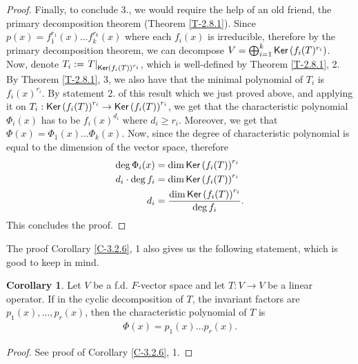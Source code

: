 \documentclass[letterpaper,11pt,twoside]{article}
\theoremstyle{definition}
\theoremstyle{definition}
\theoremstyle{definition}
\theoremstyle{definition}
\theoremstyle{definition}
\theoremstyle{definition}
\theoremstyle{remark}
\theoremstyle{definition}
\newtheorem{corollary}[proposition]{Corollary}
\newcommand{\Ker}[1]{{\fontfamily{lmss}\selectfont 
		\text{Ker}\left (#1\right )
}}
\newcommand{\rest}[2]{\left. { #1 }\right \vert_{#2}}
\begin{document}
\begin{proof}
    Finally, to conclude 3., we would require the help of an old friend, the primary decomposition theorem (Theorem \ref{T-2.8.1}). Since $ p(x) = f_{1}^{r_{1}}(x) \dots f_k^{r_k}(x) $ where each $ f_i(x) $ is irreducible, therefore by the primary decomposition theorem, we can decompose $ V = \bigoplus_{i=1}^{k}\Ker{f_{i}(T)^{r_i}}$. Now, denote $ T_i := \rest{T}{\Ker{f_{i}(T)}^{r_{i}}} $, which is well-defined by Theorem \ref{T-2.8.1}, 2. By Theorem \ref{T-2.8.1}, 3, we also have that the minimal polynomial of $ T_i $ is $ f_{i}(x)^{r_i} $. By statement 2. of this result which we just proved above, and applying it on $ T_i : \Ker{f_{i}(T)}^{r_{i}} \to \Ker{f_{i}(T)}^{r_{i}} $, we get that the characteristic polynomial $ \Phi_{i}(x) $ has to be $ f_{i}(x)^{d_i} $ where $ d_i \ge r_i $. Moreover, we get that $ \Phi(x) = \Phi_1(x)\dots \Phi_k(x) $. Now, since the degree of characteristic polynomial is equal to the dimension of the vector space, therefore 
    \begin{align*}
    	\deg \Phi_{i}(x) &= \dim \Ker{f_{i}(T)}^{r_{i}}\\
    	d_i\cdot \deg f_i &= \dim \Ker{f_{i}(T)}^{r_{i}}\\
    	d_i &= \dfrac{\dim \Ker{f_{i}(T)}^{r_{i}}}{\deg f_i}.
    \end{align*}
	This concludes the proof.
    \end{proof}
	The proof Corollary \ref{C-3.2.6}, 1 also gives us the following statement, which is good to keep in mind.
	\begin{corollary}\label{C-3.2.7}
		Let $ V $ be a f.d. $ F $-vector space and let $ T: V\to V $ be a linear operator. If in the cyclic decomposition of $ T $, the invariant factors are $ p_1(x),\dots,p_r(x) $, then the characteristic polynomial of $ T $ is
		\begin{align*}
			\Phi(x) = p_1(x)\dots p_r(x).
		\end{align*}
	\end{corollary}
	\begin{proof}
		See proof of Corollary \ref{C-3.2.6}, 1.
	\end{proof}
\end{document}

